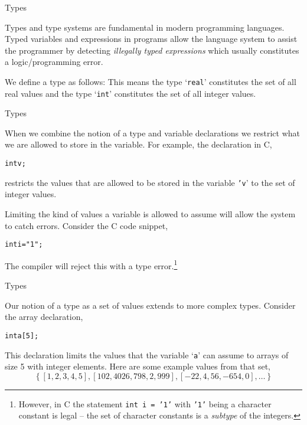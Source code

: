 \documentclass{beamer}
\begin{document}
\begin{frame}[fragile]{Types}

\small

Types and type systems are fundamental in modern programming languages.  Typed variables and expressions 
in programs allow the language system to assist the programmer by detecting {\em illegally typed expressions}
which usually constitutes a logic/programming error.

\vspace{.1in}
We define a type as follows:
This means the type `{\tt real}' constitutes the set of all real values and the type `{\tt int}' constitutes the set of all integer values.

\end{frame}

\begin{frame}[fragile]{Types}

\small
When we combine the notion of a type and variable declarations we restrict what we are allowed to store in the variable.
For example, the declaration in C,
{\scriptsize
\begin{alltt}
int v;
\end{alltt}
}
restricts the values that are allowed to be stored in the variable {\tt 'v}' to the set of integer values.

\vspace{.1in}
Limiting the kind of values a variable is allowed to assume will allow the system to catch errors. Consider the
C code snippet,
{\scriptsize
\begin{alltt}
int i = "1";
\end{alltt}
}
The compiler will reject this with a type error.\footnote{However, in C the statement {\tt int i = '1'} with {\tt '1'} being
a character constant is legal -- the set of character constants is a {\em subtype} of the integers.}

\end{frame}

\begin{frame}[fragile]{Types}

\small

Our notion of a type as a set of values extends to more complex types.  Consider the array declaration,
{\scriptsize
\begin{alltt}
int a[5];
\end{alltt}
}
This declaration limits the values that the variable `{\tt a}' can assume to arrays of size 5 with integer elements.
Here are some example values from that set,
\[
\left\{[1,2,3,4,5],[102,4026,798,2,999],[-22,4,56,-654,0],\ldots\right\}
\]

\end{frame}
\end{document}
